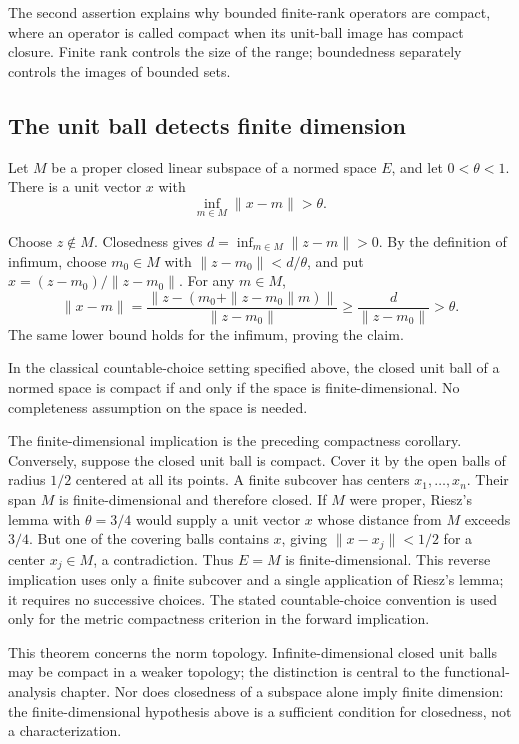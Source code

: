 The second assertion explains why bounded finite-rank operators are
compact, where an operator is called compact when its unit-ball image
has compact closure. Finite rank controls the size of the range;
boundedness separately controls the images of bounded sets.

\subsection{The unit ball detects finite dimension}
\begin{lemma}
Let $M$ be a proper closed linear subspace of a normed space $E$, and
let $0<\theta<1$. There is a unit vector $x$ with
\[
\inf_{m\in M}\|x-m\|>\theta.
\]
\end{lemma}
\Proof
Choose $z\notin M$. Closedness gives
$d=\inf_{m\in M}\|z-m\|>0$. By the definition of infimum, choose
$m_0\in M$ with $\|z-m_0\|<d/\theta$, and put
$x=(z-m_0)/\|z-m_0\|$. For any $m\in M$,
\[
\|x-m\|=
\frac{\|z-(m_0+\|z-m_0\|m)\|}{\|z-m_0\|}
\geq\frac d{\|z-m_0\|}>\theta.
\]
The same lower bound holds for the infimum, proving the claim.
\Done

\begin{theorem}
In the classical countable-choice setting specified above, the closed
unit ball of a normed space is compact if and only if the space is
finite-dimensional. No completeness assumption on the space is needed.
\end{theorem}
\Proof
The finite-dimensional implication is the preceding compactness corollary.
Conversely, suppose the closed unit ball is compact. Cover it by the
open balls of radius $1/2$ centered at all its points. A finite subcover
has centers $x_1,\ldots,x_n$. Their span $M$ is finite-dimensional
and therefore closed. If $M$ were proper, Riesz's lemma with
$\theta=3/4$ would supply a unit vector $x$ whose distance from $M$
exceeds $3/4$. But one of the covering balls contains $x$, giving
$\|x-x_j\|<1/2$ for a center $x_j\in M$, a contradiction.
Thus $E=M$ is finite-dimensional. This reverse implication uses only
a finite subcover and a single application of Riesz's lemma; it requires
no successive choices. The stated countable-choice convention is used
only for the metric compactness criterion in the forward implication.
\Done

This theorem concerns the norm topology. Infinite-dimensional closed
unit balls may be compact in a weaker topology; the distinction is
central to the functional-analysis chapter. Nor does closedness of a
subspace alone imply finite dimension: the finite-dimensional hypothesis
above is a sufficient condition for closedness, not a characterization.


